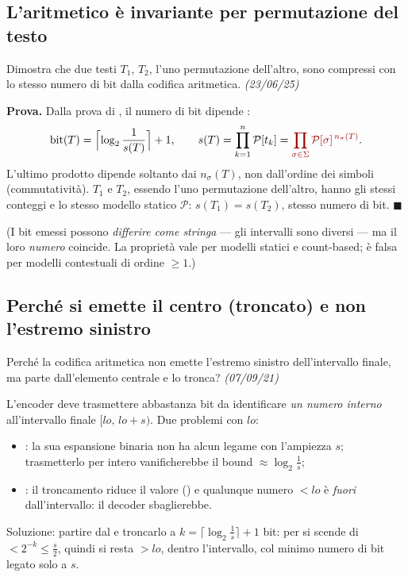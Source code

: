 \subsection*{ L'aritmetico \`e invariante per permutazione del testo}

\begin{domanda}
Dimostra che due testi $T_1$, $T_2$, l'uno permutazione dell'altro, sono compressi con lo stesso
numero di bit dalla codifica aritmetica. \emph{(23/06/25)}
\end{domanda}

\textbf{Prova.} Dalla prova di , il numero di bit dipende :
\[
\text{bit}(T)=\Bigl\lceil\log_2\frac{1}{s(T)}\Bigr\rceil+1,
\qquad
s(T)=\prod_{k=1}^{n}\mathcal{P}[t_k]
=\kw{\prod_{\sigma\in\Sigma}\mathcal{P}[\sigma]^{\,n_\sigma(T)}} .
\]
L'ultimo prodotto dipende soltanto dai  $n_\sigma(T)$, non dall'ordine dei simboli
(commutativit\`a). $T_1$ e $T_2$, essendo l'uno permutazione dell'altro, hanno gli stessi conteggi
e lo stesso modello statico $\mathcal{P}$: $s(T_1)=s(T_2)$, stesso numero di bit. $\blacksquare$

(I bit emessi possono \emph{differire come stringa} --- gli intervalli sono diversi --- ma il loro
\emph{numero} coincide. La propriet\`a vale per modelli statici e count-based; \`e falsa per
modelli contestuali di ordine $\ge1$.)

\subsection*{ Perch\'e si emette il centro (troncato) e non l'estremo sinistro}

\begin{domanda}
Perch\'e la codifica aritmetica non emette l'estremo sinistro dell'intervallo finale, ma parte
dall'elemento centrale e lo tronca? \emph{(07/09/21)}
\end{domanda}

L'encoder deve trasmettere abbastanza bit da identificare \emph{un numero interno}
all'intervallo finale $[lo,\,lo+s)$. Due problemi con $lo$:
\begin{itemize}[leftmargin=1.6em,itemsep=1pt]
\item {}: la sua espansione binaria non ha
alcun legame con l'ampiezza $s$; trasmetterlo per intero vanificherebbe il bound
$\approx\log_2\frac1s$;
\item {}: il troncamento riduce il valore () e qualunque numero
$<lo$ \`e \emph{fuori} dall'intervallo: il decoder sbaglierebbe.
\end{itemize}
Soluzione: partire dal  e troncarlo a
$k=\lceil\log_2\frac1s\rceil+1$ bit: per  si scende di $<2^{-k}\le\frac{s}{2}$, quindi si
resta $>lo$, dentro l'intervallo, col minimo numero di bit legato solo a $s$. 

